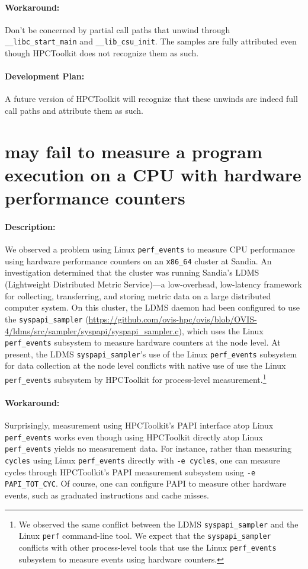 \documentclass[11pt,twoside,letterpaper]{report}
\begin{document}
\paragraph{Workaround:} Don't be concerned by partial call paths that unwind through \verb|__libc_start_main|  and \verb|__lib_csu_init|. The samples are fully attributed even though HPCToolkit does not recognize them as such.

\paragraph{Development Plan:} A future version of HPCToolkit will recognize that these unwinds are indeed full call paths and attribute them as such.

\section{\hpcrun{} may fail to measure a program execution on a CPU with hardware performance counters}

\paragraph{Description:} We observed a problem using Linux  {\tt perf\_events} to measure CPU performance using hardware performance counters on an {\tt x86\_64} cluster at Sandia. An investigation determined that the cluster was running Sandia's LDMS (Lightweight Distributed Metric Service)---a low-overhead, low-latency framework for collecting, transferring, and storing metric data on a large distributed computer system. On this cluster, the LDMS  daemon had been configured to use the {\tt syspapi\_sampler} (\url{https://github.com/ovis-hpc/ovis/blob/OVIS-4/ldms/src/sampler/syspapi/syspapi\_sampler.c}), which uses the Linux {\tt perf\_events} subsystem to measure hardware counters at the node level. At present, the LDMS {\tt syspapi\_sampler}'s use of  the Linux {\tt perf\_events} subsystem for data collection at the node level conflicts with native use of use the Linux {\tt perf\_events} subsystem by HPCToolkit for process-level measurement.\footnote{We observed the same conflict between the LDMS {\tt syspapi\_sampler}  and the Linux {\tt perf} command-line tool. We expect that the  {\tt syspapi\_sampler} 
conflicts with other process-level tools that use the Linux {\tt perf\_events} subsystem to measure events using hardware counters.}

\paragraph{Workaround:} Surprisingly, measurement using HPCToolkit's PAPI interface atop Linux  {\tt perf\_events} works even though using HPCToolkit directly atop Linux  {\tt perf\_events} yields no measurement data.  For instance, rather than measuring {\tt cycles} using Linux {\tt perf\_events} directly with {\tt -e cycles}, one can measure cycles through HPCToolkit's PAPI measurement subsystem using {\tt -e PAPI\_TOT\_CYC}. Of course, one can configure PAPI to measure other hardware events, such as graduated instructions and cache misses.
\end{document}
